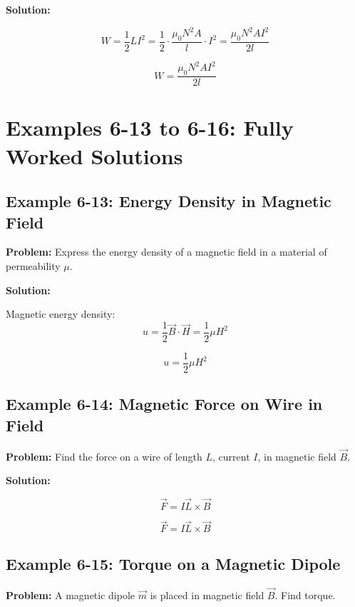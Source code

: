 \documentclass[12pt]{article}
\begin{document}
\textbf{Solution:}

\[
W = \frac{1}{2} L I^2 = \frac{1}{2} \cdot \frac{\mu_0 N^2 A}{l} \cdot I^2
= \frac{\mu_0 N^2 A I^2}{2l}
\]

\begin{tcolorbox}
\[
\boxed{W = \frac{\mu_0 N^2 A I^2}{2l}}
\]
\end{tcolorbox}



\section*{Examples 6-13 to 6-16: Fully Worked Solutions}

\subsection*{Example 6-13: Energy Density in Magnetic Field}

\textbf{Problem:}  
Express the energy density of a magnetic field in a material of permeability \( \mu \).

\textbf{Solution:}

Magnetic energy density:
\[
u = \frac{1}{2} \vec{B} \cdot \vec{H} = \frac{1}{2} \mu H^2
\]

\begin{tcolorbox}
\[
\boxed{u = \frac{1}{2} \mu H^2}
\]
\end{tcolorbox}

\subsection*{Example 6-14: Magnetic Force on Wire in Field}

\textbf{Problem:}  
Find the force on a wire of length \( L \), current \( I \), in magnetic field \( \vec{B} \).

\textbf{Solution:}

\[
\vec{F} = I \vec{L} \times \vec{B}
\]

\begin{tcolorbox}
\[
\boxed{\vec{F} = I \vec{L} \times \vec{B}}
\]
\end{tcolorbox}

\subsection*{Example 6-15: Torque on a Magnetic Dipole}

\textbf{Problem:}  
A magnetic dipole \( \vec{m} \) is placed in magnetic field \( \vec{B} \). Find torque.
\end{document}
